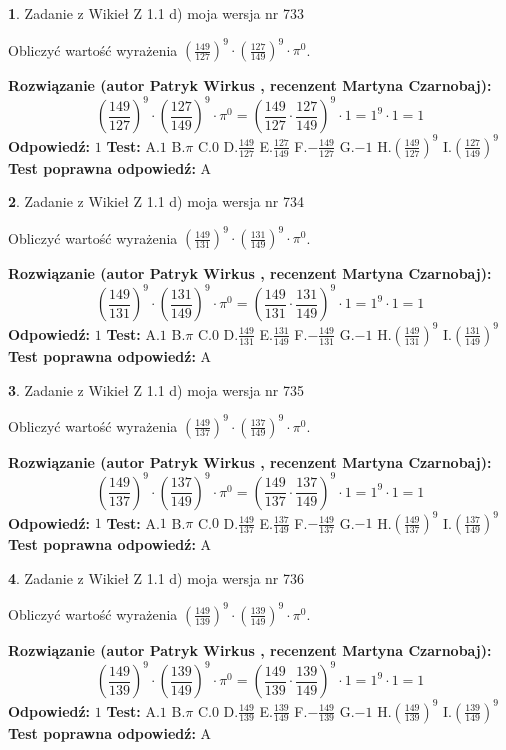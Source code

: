 \documentclass[12pt, a4paper]{article}
\theoremstyle{definition} %
\newtheorem{zad}{}
\newcommand{\zadStart}[1]{\begin{zad}#1\newline}
\newcommand{\zadStop}{\end{zad}}
\newcommand{\rozwStart}[2]{\noindent \textbf{Rozwiązanie (autor #1 , recenzent #2): }\newline}
\newcommand{\rozwStop}{\newline}
\newcommand{\odpStart}{\noindent \textbf{Odpowiedź:}\newline}
\newcommand{\odpStop}{\newline}
\newcommand{\testStart}{\noindent \textbf{Test:}\newline}
\newcommand{\testStop}{\newline}
\newcommand{\kluczStart}{\noindent \textbf{Test poprawna odpowiedź:}\newline}
\newcommand{\kluczStop}{\newline}
\begin{document}
\zadStart{Zadanie z Wikieł Z 1.1 d) moja wersja nr 733}

Obliczyć wartość wyrażenia $(\frac{149}{127})^{9} \cdot (\frac{127}{149})^{9} \cdot \pi^{0}$.
\zadStop
\rozwStart{Patryk Wirkus}{Martyna Czarnobaj}
$$(\frac{149}{127})^{9} \cdot (\frac{127}{149})^{9} \cdot \pi^{0} = (\frac{149}{127} \cdot \frac{127}{149})^{9} \cdot 1 = 1^{9} \cdot 1 = 1$$
\rozwStop
\odpStart
$1$
\odpStop
\testStart
A.$1$ B.$\pi$ C.$0$ D.$\frac{149}{127}$ E.$\frac{127}{149}$
F.$-\frac{149}{127}$ G.$-1$
H.$(\frac{149}{127})^{9}$
I.$(\frac{127}{149})^{9}$
\testStop
\kluczStart
A
\kluczStop



\zadStart{Zadanie z Wikieł Z 1.1 d) moja wersja nr 734}

Obliczyć wartość wyrażenia $(\frac{149}{131})^{9} \cdot (\frac{131}{149})^{9} \cdot \pi^{0}$.
\zadStop
\rozwStart{Patryk Wirkus}{Martyna Czarnobaj}
$$(\frac{149}{131})^{9} \cdot (\frac{131}{149})^{9} \cdot \pi^{0} = (\frac{149}{131} \cdot \frac{131}{149})^{9} \cdot 1 = 1^{9} \cdot 1 = 1$$
\rozwStop
\odpStart
$1$
\odpStop
\testStart
A.$1$ B.$\pi$ C.$0$ D.$\frac{149}{131}$ E.$\frac{131}{149}$
F.$-\frac{149}{131}$ G.$-1$
H.$(\frac{149}{131})^{9}$
I.$(\frac{131}{149})^{9}$
\testStop
\kluczStart
A
\kluczStop



\zadStart{Zadanie z Wikieł Z 1.1 d) moja wersja nr 735}

Obliczyć wartość wyrażenia $(\frac{149}{137})^{9} \cdot (\frac{137}{149})^{9} \cdot \pi^{0}$.
\zadStop
\rozwStart{Patryk Wirkus}{Martyna Czarnobaj}
$$(\frac{149}{137})^{9} \cdot (\frac{137}{149})^{9} \cdot \pi^{0} = (\frac{149}{137} \cdot \frac{137}{149})^{9} \cdot 1 = 1^{9} \cdot 1 = 1$$
\rozwStop
\odpStart
$1$
\odpStop
\testStart
A.$1$ B.$\pi$ C.$0$ D.$\frac{149}{137}$ E.$\frac{137}{149}$
F.$-\frac{149}{137}$ G.$-1$
H.$(\frac{149}{137})^{9}$
I.$(\frac{137}{149})^{9}$
\testStop
\kluczStart
A
\kluczStop



\zadStart{Zadanie z Wikieł Z 1.1 d) moja wersja nr 736}

Obliczyć wartość wyrażenia $(\frac{149}{139})^{9} \cdot (\frac{139}{149})^{9} \cdot \pi^{0}$.
\zadStop
\rozwStart{Patryk Wirkus}{Martyna Czarnobaj}
$$(\frac{149}{139})^{9} \cdot (\frac{139}{149})^{9} \cdot \pi^{0} = (\frac{149}{139} \cdot \frac{139}{149})^{9} \cdot 1 = 1^{9} \cdot 1 = 1$$
\rozwStop
\odpStart
$1$
\odpStop
\testStart
A.$1$ B.$\pi$ C.$0$ D.$\frac{149}{139}$ E.$\frac{139}{149}$
F.$-\frac{149}{139}$ G.$-1$
H.$(\frac{149}{139})^{9}$
I.$(\frac{139}{149})^{9}$
\testStop
\kluczStart
A
\kluczStop
\end{document}

